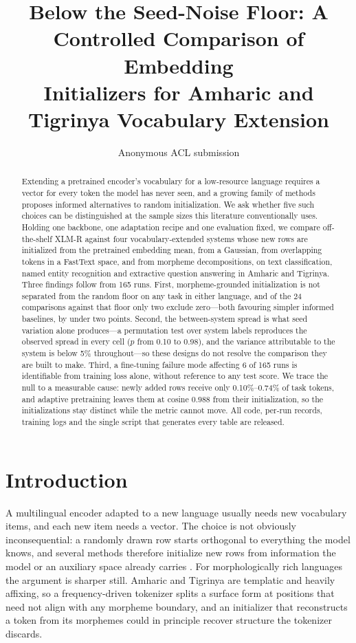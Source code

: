 \documentclass[11pt]{article}
\title{Below the Seed-Noise Floor: A Controlled Comparison of Embedding\\
Initializers for Amharic and Tigrinya Vocabulary Extension}
\author{Anonymous ACL submission}
\begin{document}
\maketitle

\begin{abstract}
Extending a pretrained encoder's vocabulary for a low-resource language
requires a vector for every token the model has never seen, and a growing
family of methods proposes informed alternatives to random initialization.
We ask whether five such choices can be distinguished at the sample sizes
this literature conventionally uses. Holding one backbone, one adaptation
recipe and one evaluation fixed, we compare off-the-shelf XLM-R against four
vocabulary-extended systems whose new rows are initialized from the
pretrained embedding mean, from a Gaussian, from overlapping tokens in a
FastText space, and from morpheme decompositions, on text classification,
named entity recognition and extractive question answering in Amharic and
Tigrinya. Three findings follow from 165 runs. First, morpheme-grounded
initialization is not separated from the random floor on any task in either
language, and of the 24 comparisons against that floor only two exclude
zero---both favouring simpler informed baselines, by under two points.
Second, the between-system spread is what seed
variation alone produces---a permutation test over system labels reproduces
the observed spread in every cell ($p$ from 0.10 to 0.98), and the variance
attributable to the system is below 5\% throughout---so these designs do not
resolve the comparison they are built to make. Third, a fine-tuning failure
mode affecting 6 of 165 runs is identifiable from training loss alone,
without reference to any test score. We trace the null to a measurable cause:
newly added rows receive only 0.10\%--0.74\% of task tokens, and adaptive
pretraining leaves them at cosine $0.988$ from their initialization, so the
initializations stay distinct while the metric cannot move. All code, per-run records, training
logs and the single script that generates every table are released.
\end{abstract}

\section{Introduction}

A multilingual encoder adapted to a new language usually needs new vocabulary
items, and each new item needs a vector. The choice is not obviously
inconsequential: a randomly drawn row starts orthogonal to everything the
model knows, and several methods therefore initialize new rows from
information the model or an auxiliary space already carries
\citep{minixhofer-etal-2022-wechsel,dobler-de-melo-2023-focus,liu-etal-2024-ofa}.
For morphologically rich languages the argument is sharper still. Amharic and
Tigrinya are templatic and heavily affixing, so a frequency-driven tokenizer
splits a surface form at positions that need not align with any morpheme
boundary, and an initializer that reconstructs a token from its morphemes
could in principle recover structure the tokenizer discards.
\end{document}
